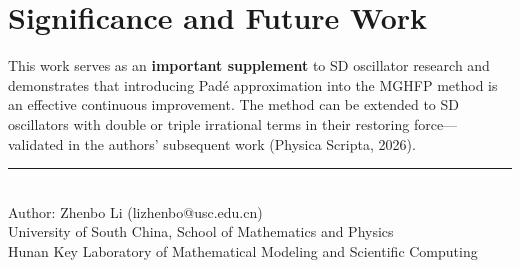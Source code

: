 \documentclass[11pt,a4paper]{article}
\begin{document}
\section{Significance and Future Work}

This work serves as an \textbf{important supplement} to SD oscillator research and demonstrates that introducing Pad\'e approximation into the MGHFP method is an effective continuous improvement. The method can be extended to SD oscillators with double or triple irrational terms in their restoring force---validated in the authors' subsequent work (Physica Scripta, 2026).

\vfill
\begin{center}
\small\rule{0.5\textwidth}{0.3pt}\\[4pt]
\small\color{primary} Author: Zhenbo Li (lizhenbo@usc.edu.cn)\\
\small University of South China, School of Mathematics and Physics\\
\small Hunan Key Laboratory of Mathematical Modeling and Scientific Computing
\end{center}
\end{document}
